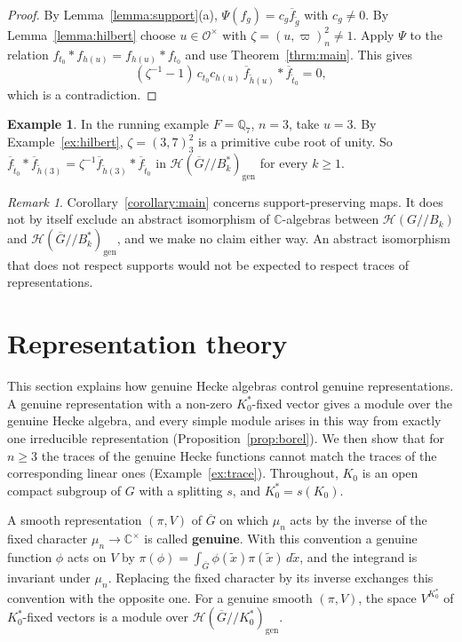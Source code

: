 \documentclass[12pt,letterpaper]{amsart}
\numberwithin{equation}{section}
\theoremstyle{definition}
\newtheorem{example}[theorem]{Example}
\theoremstyle{remark}
\newtheorem{remark}[theorem]{Remark}
\newcommand{\cO}{\mathcal{O}}
\newcommand{\cH}{\mathcal{H}}
\newcommand{\C}{\mathbb{C}}
\newcommand{\Gbar}{\overline{G}}
\newcommand{\gen}{\mathrm{gen}}
\newcommand{\fbar}{\overline{f}}
\newcommand{\Hgen}{\cH(\Gbar/\!/B_k^*)_{\gen}}
\newcommand{\Hlin}{\cH(G/\!/B_k)}
\begin{document}
\begin{proof}
By Lemma~\ref{lemma:support}(a), $\Psi(f_g)=c_g\fbar_{\tilde g}$ with
$c_g\neq 0$. By Lemma~\ref{lemma:hilbert} choose $u\in\cO^\times$ with
$\zeta=(u,\varpi)_n^2\neq 1$. Apply $\Psi$ to the relation
$f_{t_0}*f_{h(u)}=f_{h(u)}*f_{t_0}$ and use Theorem~\ref{thrm:main}.
This gives
\[
(\zeta^{-1}-1)\,c_{t_0}c_{h(u)}\,
\fbar_{\tilde h(u)}*\fbar_{\tilde t_0}=0,
\]
which is a contradiction.
\end{proof}

\begin{example}
\label{ex:q7}
In the running example $F=\mathbb{Q}_7$, $n=3$, take $u=3$. By
Example~\ref{ex:hilbert}, $\zeta=(3,7)_3^2$ is a primitive cube root of
unity. So $\fbar_{\tilde t_0}*\fbar_{\tilde h(3)}
=\zeta^{-1}\fbar_{\tilde h(3)}*\fbar_{\tilde t_0}$ in
$\cH(\Gbar/\!/B_k^*)_{\gen}$ for every $k\geq 1$.
\end{example}

\begin{remark}
Corollary~\ref{corollary:main} concerns support-preserving maps. It
does not by itself exclude an abstract isomorphism of $\C$-algebras
between $\Hlin$ and $\Hgen$, and we make no claim either way. An
abstract isomorphism that does not respect supports would not be
expected to respect traces of representations.
\end{remark}

\section{Representation theory}
\label{section:reps}

This section explains how genuine Hecke algebras control genuine
representations. A genuine representation with a non-zero
$K_0^*$-fixed vector gives a module over the genuine Hecke algebra,
and every simple module arises in this way from exactly one irreducible
representation (Proposition~\ref{prop:borel}). We then show that for
$n\geq 3$ the traces of the genuine Hecke functions cannot match the
traces of the corresponding linear ones (Example~\ref{ex:trace}).
Throughout, $K_0$ is an open compact subgroup of $G$ with a splitting
$s$, and $K_0^*=s(K_0)$.

A smooth representation $(\pi,V)$ of $\Gbar$ on which $\mu_n$ acts by
the inverse of the fixed character $\mu_n\to\C^\times$ is called
\textbf{genuine}. With this convention a genuine function $\phi$ acts
on $V$ by $\pi(\phi)=\int_{\Gbar}\phi(\tilde x)\pi(\tilde x)\,d\tilde
x$, and the integrand is invariant under $\mu_n$. Replacing the fixed
character by its inverse exchanges this convention with the opposite
one. For a genuine smooth $(\pi,V)$, the space $V^{K_0^*}$ of
$K_0^*$-fixed vectors is a module over $\cH(\Gbar/\!/K_0^*)_{\gen}$.
\end{document}
